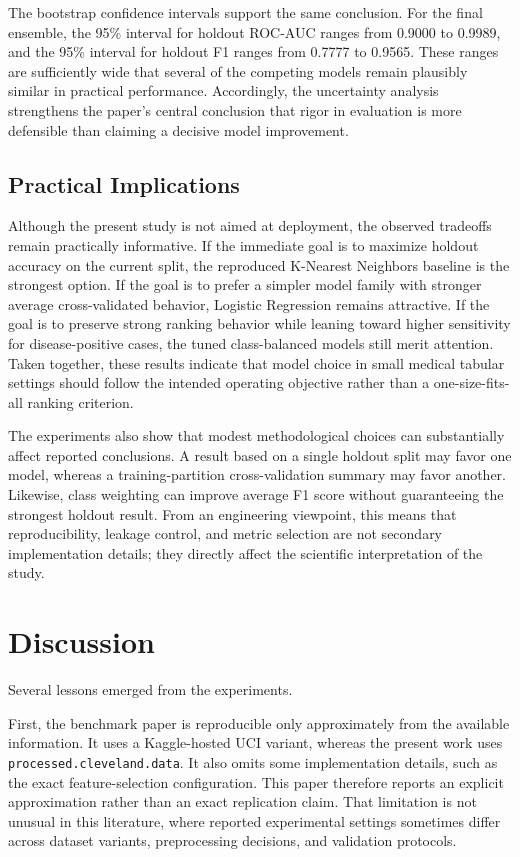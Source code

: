 \documentclass[conference]{IEEEtran}
\begin{document}
The bootstrap confidence intervals support the same conclusion. For the final ensemble, the 95\% interval for holdout ROC-AUC ranges from 0.9000 to 0.9989, and the 95\% interval for holdout F1 ranges from 0.7777 to 0.9565. These ranges are sufficiently wide that several of the competing models remain plausibly similar in practical performance. Accordingly, the uncertainty analysis strengthens the paper's central conclusion that rigor in evaluation is more defensible than claiming a decisive model improvement.

\subsection{Practical Implications}
Although the present study is not aimed at deployment, the observed tradeoffs remain practically informative. If the immediate goal is to maximize holdout accuracy on the current split, the reproduced K-Nearest Neighbors baseline is the strongest option. If the goal is to prefer a simpler model family with stronger average cross-validated behavior, Logistic Regression remains attractive. If the goal is to preserve strong ranking behavior while leaning toward higher sensitivity for disease-positive cases, the tuned class-balanced models still merit attention. Taken together, these results indicate that model choice in small medical tabular settings should follow the intended operating objective rather than a one-size-fits-all ranking criterion.

The experiments also show that modest methodological choices can substantially affect reported conclusions. A result based on a single holdout split may favor one model, whereas a training-partition cross-validation summary may favor another. Likewise, class weighting can improve average F1 score without guaranteeing the strongest holdout result. From an engineering viewpoint, this means that reproducibility, leakage control, and metric selection are not secondary implementation details; they directly affect the scientific interpretation of the study.

\section{Discussion}
Several lessons emerged from the experiments.

First, the benchmark paper is reproducible only approximately from the available information. It uses a Kaggle-hosted UCI variant, whereas the present work uses \texttt{processed.cleveland.data}. It also omits some implementation details, such as the exact feature-selection configuration. This paper therefore reports an explicit approximation rather than an exact replication claim. That limitation is not unusual in this literature, where reported experimental settings sometimes differ across dataset variants, preprocessing decisions, and validation protocols.
\end{document}

